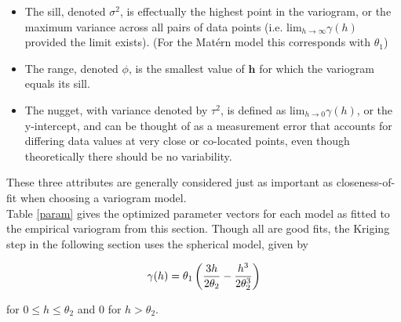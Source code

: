 \documentclass[12pt,twoside]{reedthesis}
\begin{document}
\begin{itemize}
\item The sill, denoted $\sigma^2$, is effectually the highest point in the variogram, or the maximum variance across all pairs of data points (i.e. $\text{lim}_{h\to\infty}\gamma(h)$ provided the limit exists). (For the Mat\'ern model this corresponds with $\theta_1$) 

\item The range, denoted $\phi$, is the smallest value of $\mathbf{h}$ for which the variogram equals its sill. 

\item The nugget, with variance denoted by $\tau^2$, is defined as $\text{lim}_{h\to0}\gamma(h)$, or the y-intercept,  and can be thought of as a measurement error that accounts for differing data values at very close or co-located points, even though theoretically there should be no variability. 

\end{itemize}

These three attributes are generally considered just as important as closeness-of-fit when choosing a variogram model. \\


Table \ref{param} gives the optimized parameter vectors for each model as fitted to the empirical variogram from this section. Though all are good fits, the Kriging step in the following section uses the spherical model, given by

\begin{align*}
\gamma(h) = \theta_1 \left ( {{3h}\over{2\theta_2}} - {{h^3}\over{2\theta_2^3}} \right )
\end{align*}

for $0 \leq h \leq \theta_2$ and 0 for $h > \theta_2$. \\
	
	   
	  
	
	
	   
\end{document}
